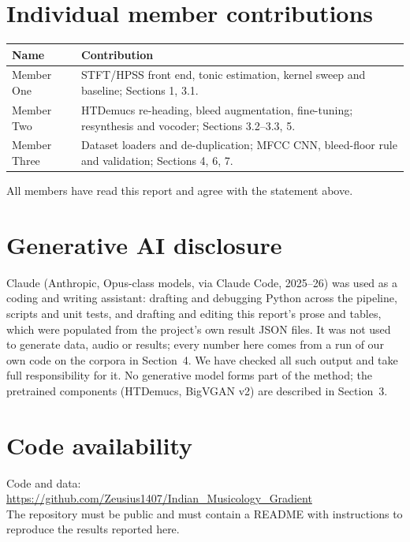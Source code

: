 \documentclass[11pt,a4paper,twocolumn]{article}
\newcommand{\githuburl}{https://github.com/Zeusius1407/Indian_Musicology_Gradient}
\begin{document}
\section*{Individual member contributions}
{\small
\begin{tabularx}{\linewidth}{@{}l X@{}}
\toprule
Name & Contribution \\
\midrule
Member One & STFT/HPSS front end, tonic estimation, kernel sweep and baseline; Sections 1, 3.1. \\
Member Two & HTDemucs re-heading, bleed augmentation, fine-tuning; resynthesis and vocoder; Sections 3.2--3.3, 5. \\
Member Three & Dataset loaders and de-duplication; MFCC CNN, bleed-floor rule and validation; Sections 4, 6, 7. \\
\bottomrule
\end{tabularx}}

\smallskip
\noindent All members have read this report and agree with the statement above.

\section*{Generative AI disclosure}
Claude (Anthropic, Opus-class models, via Claude Code, 2025--26) was used as a coding and writing
assistant: drafting and debugging Python across the pipeline, scripts and unit tests, and drafting
and editing this report's prose and tables, which were populated from the project's own result
JSON files. It was not used to generate data, audio or results; every number here comes from a run
of our own code on the corpora in Section~4. We have checked all such output and take full
responsibility for it. No generative model forms part of the method; the pretrained components
(HTDemucs, BigVGAN v2) are described in Section~3.

\section*{Code availability}
\noindent Code and data:\\
\url{\githuburl}\\
The repository must be public and must contain a README with instructions to reproduce the
results reported here.
\end{document}
